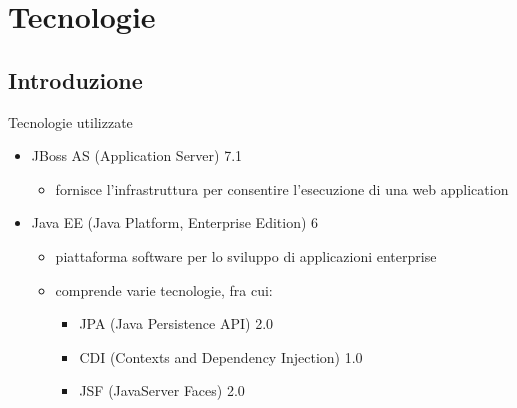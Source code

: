 \section{Tecnologie}

\subsection{Introduzione}

\begin{frame}{Tecnologie utilizzate}

\begin{itemize}
\item JBoss AS (Application Server) 7.1
	\begin{itemize}
	
	\vspace{0.5em}
	
	\item fornisce l'infrastruttura per consentire l'esecuzione di una web application
	\end{itemize}

\vspace{1em}

\item Java EE (Java Platform, Enterprise Edition) 6
	\begin{itemize}
	
	\vspace{0.5em}
	
	\item piattaforma software per lo sviluppo di applicazioni enterprise
	
	\vspace{0.7em}
	
	\item comprende varie tecnologie, fra cui:
		\begin{itemize}
		
		\vspace{0.4em}
		
		\item JPA (Java Persistence API) 2.0
		
		\vspace{0.6em}
		
		\item CDI (Contexts and Dependency Injection) 1.0
		
		\vspace{0.6em}
		
		\item JSF (JavaServer Faces) 2.0
		\end{itemize}
		
	\end{itemize}

\end{itemize}


\end{frame}

